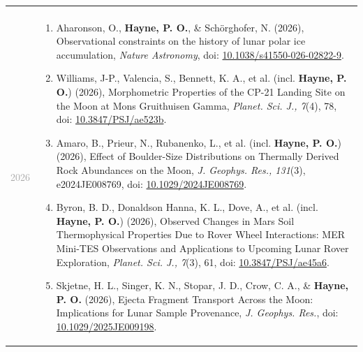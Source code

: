 \documentclass[letterpaper,10pt,twoside]{article}
\begin{document}
\hrulefill
~\\
\noindent\begin{longtable}{@{} p{} p{}}
        &  \\
        \noindent\textcolor{darkgray}{2026} &
        \begin{enumerate}[leftmargin=!,labelindent=2.5pt,itemindent=-10pt]
            \item{\small Aharonson, O., \textbf{Hayne, P. O.}, \& Sch{\"o}rghofer, N. (2026), Observational constraints on the history of lunar polar ice accumulation, \textit{Nature Astronomy}, doi: \href{https://doi.org/10.1038/s41550-026-02822-9}{10.1038/s41550-026-02822-9}.
            }
            \item{\small Williams, J-P., Valencia, S., Bennett, K. A., et al. (incl. \textbf{Hayne, P. O.}) (2026), Morphometric Properties of the CP-21 Landing Site on the Moon at Mons Gruithuisen Gamma, \textit{Planet. Sci. J., 7}(4), 78, doi: \href{https://doi.org/10.3847/PSJ/ae523b}{10.3847/PSJ/ae523b}.
            }
            \item{\small Amaro, B., Prieur, N., Rubanenko, L., et al. (incl. \textbf{Hayne, P. O.}) (2026), Effect of Boulder-Size Distributions on Thermally Derived Rock Abundances on the Moon, \textit{J. Geophys. Res., 131}(3), e2024JE008769, doi: \href{https://doi.org/10.1029/2024JE008769}{10.1029/2024JE008769}.
            }
            \item{\small Byron, B. D., Donaldson Hanna, K. L., Dove, A., et al. (incl. \textbf{Hayne, P. O.}) (2026), Observed Changes in Mars Soil Thermophysical Properties Due to Rover Wheel Interactions: MER Mini-TES Observations and Applications to Upcoming Lunar Rover Exploration, \textit{Planet. Sci. J., 7}(3), 61, doi: \href{https://doi.org/10.3847/PSJ/ae45a6}{10.3847/PSJ/ae45a6}.
            }
            \item{\small Skjetne, H. L., Singer, K. N., Stopar, J. D., Crow, C. A., \& \textbf{Hayne, P. O.} (2026), Ejecta Fragment Transport Across the Moon: Implications for Lunar Sample Provenance, \textit{J. Geophys. Res.}, doi: \href{https://doi.org/10.1029/2025JE009198}{10.1029/2025JE009198}.
            }
        \end{enumerate}\\


\end{longtable}
\end{document}
